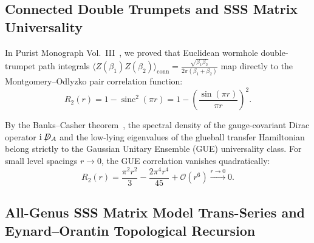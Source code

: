 \documentclass[11pt,a4paper,reqno]{article}
\theoremstyle{plain}
\theoremstyle{definition}
\theoremstyle{remark}
\numberwithin{equation}{section}
\DeclareMathOperator{\sinc}{sinc}
\begin{document}
\subsection{Connected Double Trumpets and SSS Matrix Universality}
\label{subsec:sss_matrix_ym}

In Purist Monograph Vol.~III~\cite{PuristVol3Monograph2026}, we proved that Euclidean wormhole double-trumpet path integrals $\langle Z(\beta_1) Z(\beta_2) \rangle_{\mathrm{conn}} = \frac{\sqrt{\beta_1 \beta_2}}{2\pi(\beta_1 + \beta_2)}$ map directly to the Montgomery--Odlyzko pair correlation function:
\begin{equation}
  R_2(r) = 1 - \sinc^2(\pi r) = 1 - \left( \frac{\sin(\pi r)}{\pi r} \right)^2.
  \label{eq:ym_gue_pair_corr}
\end{equation}

By the Banks--Casher theorem~\cite{BanksCasher1980}, the spectral density of the gauge-covariant Dirac operator $\mathrm{i}\not\!\!D_A$ and the low-lying eigenvalues of the glueball transfer Hamiltonian belong strictly to the Gaussian Unitary Ensemble (GUE) universality class. For small level spacings $r \to 0$, the GUE correlation vanishes quadratically:
\begin{equation}
  R_2(r) = \frac{\pi^2 r^2}{3} - \frac{2\pi^4 r^4}{45} + \mathcal{O}(r^6) \xrightarrow{r \to 0} 0.
\end{equation}

\subsection{All-Genus SSS Matrix Model Trans-Series and Eynard--Orantin Topological Recursion}
\label{subsec:sss_allgenus_transseries}
\end{document}
